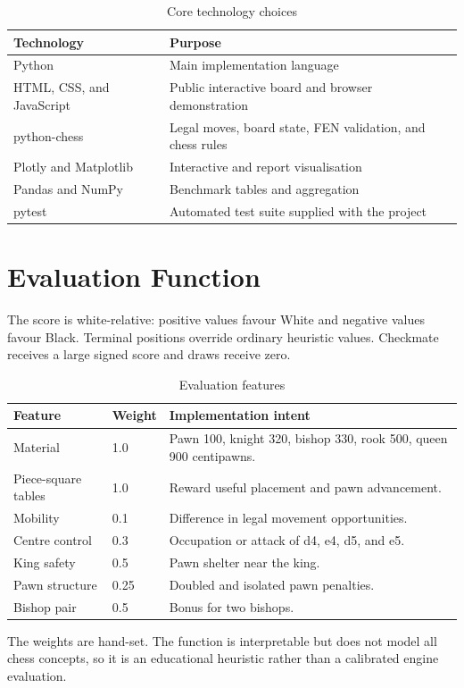 \documentclass[12pt,a4paper]{report}
\begin{document}
\begin{table}[H]\centering\caption{Core technology choices}
\begin{tabular}{p{}p{}}\toprule
Technology & Purpose\\\midrule
Python & Main implementation language\\
HTML, CSS, and JavaScript & Public interactive board and browser demonstration\\
python-chess & Legal moves, board state, FEN validation, and chess rules\\
Plotly and Matplotlib & Interactive and report visualisation\\
Pandas and NumPy & Benchmark tables and aggregation\\
pytest & Automated test suite supplied with the project\\\bottomrule
\end{tabular}\end{table}

\section{Evaluation Function}
The score is white-relative: positive values favour White and negative values favour Black. Terminal positions override ordinary heuristic values. Checkmate receives a large signed score and draws receive zero.
\begin{table}[H]\centering\caption{Evaluation features}\label{tab:eval}
\begin{tabular}{p{}p{}p{}}\toprule
Feature & Weight & Implementation intent\\\midrule
Material & 1.0 & Pawn 100, knight 320, bishop 330, rook 500, queen 900 centipawns.\\
Piece-square tables & 1.0 & Reward useful placement and pawn advancement.\\
Mobility & 0.1 & Difference in legal movement opportunities.\\
Centre control & 0.3 & Occupation or attack of d4, e4, d5, and e5.\\
King safety & 0.5 & Pawn shelter near the king.\\
Pawn structure & 0.25 & Doubled and isolated pawn penalties.\\
Bishop pair & 0.5 & Bonus for two bishops.\\\bottomrule
\end{tabular}\end{table}
The weights are hand-set. The function is interpretable but does not model all chess concepts, so it is an educational heuristic rather than a calibrated engine evaluation.
\end{document}
